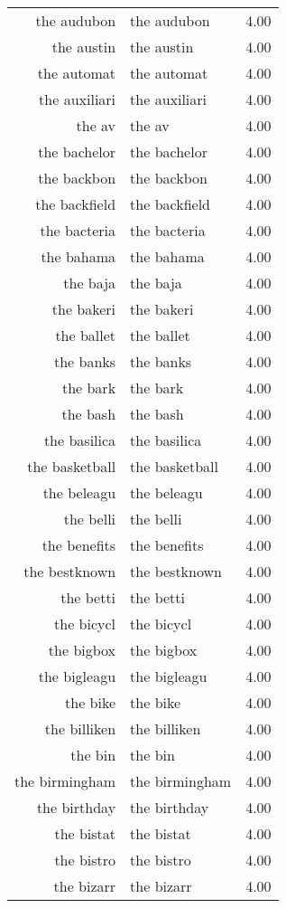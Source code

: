 \begin{table}[ht]
\begin{tabular}{rlr}
  the audubon & the audubon & 4.00 \\ 
  the austin & the austin & 4.00 \\ 
  the automat & the automat & 4.00 \\ 
  the auxiliari & the auxiliari & 4.00 \\ 
  the av & the av & 4.00 \\ 
  the bachelor & the bachelor & 4.00 \\ 
  the backbon & the backbon & 4.00 \\ 
  the backfield & the backfield & 4.00 \\ 
  the bacteria & the bacteria & 4.00 \\ 
  the bahama & the bahama & 4.00 \\ 
  the baja & the baja & 4.00 \\ 
  the bakeri & the bakeri & 4.00 \\ 
  the ballet & the ballet & 4.00 \\ 
  the banks & the banks & 4.00 \\ 
  the bark & the bark & 4.00 \\ 
  the bash & the bash & 4.00 \\ 
  the basilica & the basilica & 4.00 \\ 
  the basketball & the basketball & 4.00 \\ 
  the beleagu & the beleagu & 4.00 \\ 
  the belli & the belli & 4.00 \\ 
  the benefits & the benefits & 4.00 \\ 
  the bestknown & the bestknown & 4.00 \\ 
  the betti & the betti & 4.00 \\ 
  the bicycl & the bicycl & 4.00 \\ 
  the bigbox & the bigbox & 4.00 \\ 
  the bigleagu & the bigleagu & 4.00 \\ 
  the bike & the bike & 4.00 \\ 
  the billiken & the billiken & 4.00 \\ 
  the bin & the bin & 4.00 \\ 
  the birmingham & the birmingham & 4.00 \\ 
  the birthday & the birthday & 4.00 \\ 
  the bistat & the bistat & 4.00 \\ 
  the bistro & the bistro & 4.00 \\ 
  the bizarr & the bizarr & 4.00 \\ 

\end{tabular}
\end{table}
